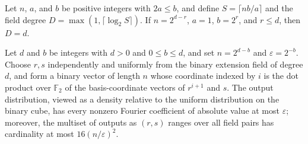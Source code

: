 \begin{theorem}
\label{FABL.SmallBiasInput.fieldDegree_eq_of_dyadic}
\leanok
{}
Let $n$, $a$, and $b$ be positive integers with $2a\le b$, and define $S=\lceil
nb/a\rceil$ and the field degree $D=\max(1,\lceil\log_2 S\rceil)$. If $n=2^{d-r}$,
$a=1$, $b=2^r$, and $r\le d$, then $D=d$.
\end{theorem}

\begin{theorem}
\label{FABL.smallBiasGenerator_core_powerOfTwo}
\leanok
{}
Let $d$ and $b$ be integers with $d>0$ and $0\le b\le d$, and set $n=2^{d-b}$ and
$\varepsilon=2^{-b}$. Choose $r,s$ independently and uniformly from the binary extension
field of degree $d$, and form a binary vector of length $n$ whose coordinate indexed by
$i$ is the dot product over $\mathbb F_2$ of the basis-coordinate vectors of $r^{i+1}$
and $s$. The output distribution, viewed as a density relative to the uniform
distribution on the binary cube, has every nonzero Fourier coefficient of absolute value
at most $\varepsilon$; moreover, the multiset of outputs as $(r,s)$ ranges over all
field pairs has cardinality at most $16(n/\varepsilon)^2$.
\end{theorem}
